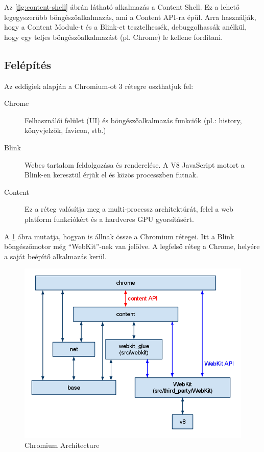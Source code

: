 \documentclass[12pt]{report}
\begin{document}
\noindent
Az \ref{fig:content-shell} ábrán látható alkalmazás a Content Shell. Ez a lehető
legegyszerűbb böngészőalkalmazás, ami a Content API-ra épül. Arra használják, hogy a
Content Module-t és a Blink-et tesztelhessék, debuggolhassák anélkül, hogy egy teljes
böngészőalkalmazást (pl. Chrome) le kellene fordítani.

\subsection{Felépítés}
Az eddigiek alapján a Chromium-ot 3 rétegre oszthatjuk fel:
\begin{description}
    \item[Chrome]
        Felhasználói felület (UI) és böngészőalkalmazás funkciók
        (pl.: history, könyvjelzők, favicon, stb.)
    \item[Blink]
        Webes tartalom feldolgozása és renderelése. A V8 JavaScript motort a
        Blink-en keresztül érjük el és közös processzben futnak.
    \item[Content]
        Ez a réteg valósítja meg a multi-processz architektúrát,
        felel a web platform funkciókért és a hardveres GPU gyorsításért.
\end{description}
A \ref{fig:chromium-architecture} ábra mutatja, hogyan is állnak össze a Chromium rétegei.
Itt a Blink böngészőmotor még ``WebKit''-nek van jelölve.
A legfelső réteg a Chrome, helyére a saját beépítő alkalmazás kerül.

\begin{figure}[h]
    \centering
    \includegraphics[scale=0.6]{chromium-architecture}
    \caption{
        \label{fig:chromium-architecture}
        Chromium Architecture \cite{bib:chromium-content-module}
    }
\end{figure}
\end{document}
